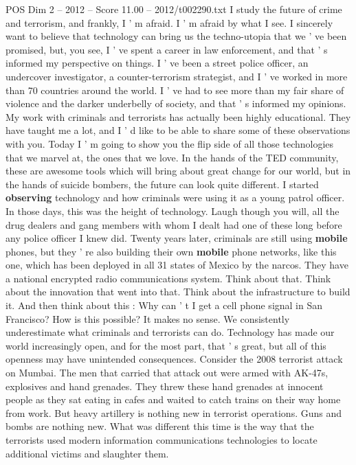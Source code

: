 \begin{textsample}{POS Dim 2 – 2012 – Score 11.00 – 2012/t002290.txt}  \label{ex:f2_pos_071}
I study the future of crime and terrorism, and frankly, I ' m afraid.
I ' m afraid by what I see.
I sincerely want to believe that technology can bring us the techno-utopia that we ' ve been promised, but, you see, I ' ve spent a career in law enforcement, and that ' s informed my perspective on things.
I ' ve been a street police officer, an undercover investigator, a counter-terrorism strategist, and I ' ve worked in more than 70 countries around the world.
I ' ve had to see more than my fair share of violence and the darker underbelly of society, and that ' s informed my opinions.
My work with criminals and terrorists has actually been highly educational.
They have taught me a lot, and I ' d like to be able to share some of these observations with you.
Today I ' m going to show you the flip side of all those technologies that we marvel at, the ones that we love.
In the hands of the TED community, these are awesome tools which will bring about great change for our world, but in the hands of suicide bombers, the future can look quite different.
I started \textbf{observing} technology and how criminals were using it as a young patrol officer.
In those days, this was the height of technology.
Laugh though you will, all the drug dealers and gang members with whom I dealt had one of these long before any police officer I knew did.
Twenty years later, criminals are still using \textbf{mobile} phones, but they ' re also building their own \textbf{mobile} phone networks, like this one, which has been deployed in all 31 states of Mexico by the narcos.
They have a national encrypted radio communications system.
Think about that.
Think about the innovation that went into that.
Think about the infrastructure to build it.
And then think about this : Why can ' t I get a cell phone signal in San Francisco?
How is this possible?
It makes no sense.
We consistently underestimate what criminals and terrorists can do.
Technology has made our world increasingly open, and for the most part, that ' s great, but all of this openness may have unintended consequences.
Consider the 2008 terrorist attack on Mumbai.
The men that carried that attack out were armed with AK-47s, explosives and hand grenades.
They threw these hand grenades at innocent people as they sat eating in cafes and waited to catch trains on their way home from work.
But heavy artillery is nothing new in terrorist operations.
Guns and bombs are nothing new.
What was different this time is the way that the terrorists used modern information communications technologies to locate additional victims and slaughter them.

\end{textsample}

